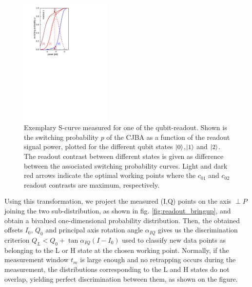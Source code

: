 \begin{figure}
\centering
\includegraphics[width=0.4\textwidth]{./material/papers/grover/figures/s_curves_example}
\caption{Exemplary S-curve measured for one of the qubit-readout. Shown is the switching probability $p$ of the CJBA as a function of the readout signal power, plotted for the different qubit states $\left| 0 \right>$,$\left| 1 \right>$ and $\left| 2 \right>$. The readout contrast between different states is given as difference between the associated switching probability curves. Light and dark red arrows indicate the optimal working points where the $c_{01}$ and $c_{02}$ readout contrasts are maximum, respectively.}
\label{fig:s_curves_example}
\end{figure}

Using this transformation, we project the measured (I,Q) points on the axis $\perp P$ joining the two sub-distribution, as shown in fig. \ref{fig:readout_bringup}, and obtain a bivalued one-dimensional probability distribution. Then, the obtained offsets $I_0$, $Q_0$ and principal axis rotation angle $\alpha_{IQ}$ gives us the discrimination criterion $Q_L<Q_0+\tan{\alpha_{IQ}}(I-I_0)$ used to classify new data points as belonging to the L or H state at the chosen working point. Normally, if the measurement window $t_m$ is large enough and no retrapping occurs during the measurement, the distributions corresponding to the L and H states do not overlap, yielding perfect discrimination between them, as shown on the figure.

\smallskip

